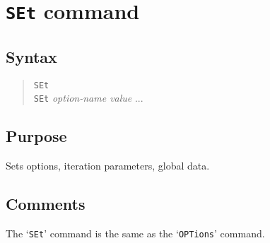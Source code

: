 \section{{\tt SEt} command}
\subsection{Syntax}
\begin{verse}
{\tt SEt}\\
{\tt SEt} {\it option-name value} ...
\end{verse}
\subsection{Purpose}

Sets options, iteration parameters, global data.
\subsection{Comments}

The `{\tt SEt}' command is the same as the `{\tt OPTions}' command.
